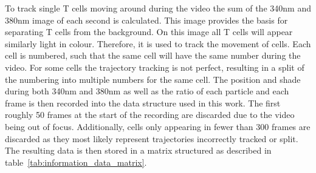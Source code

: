 To track single T cells moving around during the video the sum of the 340nm and 380nm image of each second is calculated. This image provides the basis for separating T cells from the background. On this image all T cells will appear similarly light in colour. Therefore, it is used to track the movement of cells. Each cell is numbered, such that the same cell will have the same number during the video. For some cells the trajectory tracking is not perfect, resulting in a split of the numbering into multiple numbers for the same cell. The position and shade during both 340nm and 380nm as well as the ratio of each particle and each frame is then recorded into the data structure used in this work. The first roughly 50 frames at the start of the recording are discarded due to the video being out of focus. Additionally, cells only appearing in fewer than 300 frames are discarded as they most likely represent trajectories incorrectly tracked or split. The resulting data is then stored in a matrix structured as described in table~\ref{tab:information_data_matrix}.
